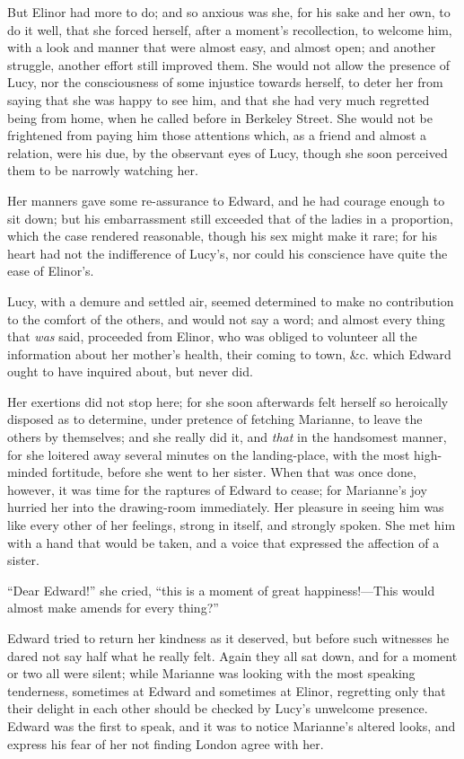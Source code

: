 \documentclass{article}
\begin{document}
But Elinor had more to do; and so anxious was she,
for his sake and her own, to do it well, that she
forced herself, after a moment's recollection,
to welcome him, with a look and manner that were almost easy,
and almost open; and another struggle, another effort still
improved them.  She would not allow the presence of Lucy,
nor the consciousness of some injustice towards herself,
to deter her from saying that she was happy to see him,
and that she had very much regretted being from home,
when he called before in Berkeley Street.  She would
not be frightened from paying him those attentions which,
as a friend and almost a relation, were his due, by the
observant eyes of Lucy, though she soon perceived them
to be narrowly watching her.

Her manners gave some re-assurance to Edward, and he
had courage enough to sit down; but his embarrassment still
exceeded that of the ladies in a proportion, which the case
rendered reasonable, though his sex might make it rare;
for his heart had not the indifference of Lucy's, nor
could his conscience have quite the ease of Elinor's.

Lucy, with a demure and settled air, seemed determined
to make no contribution to the comfort of the others,
and would not say a word; and almost every thing that \emph{was}
said, proceeded from Elinor, who was obliged to volunteer
all the information about her mother's health, their coming
to town, \&c. which Edward ought to have inquired about,
but never did.

Her exertions did not stop here; for she soon
afterwards felt herself so heroically disposed as
to determine, under pretence of fetching Marianne,
to leave the others by themselves; and she really did it,
and \emph{that} in the handsomest manner, for she loitered away
several minutes on the landing-place, with the most
high-minded fortitude, before she went to her sister.
When that was once done, however, it was time for the raptures
of Edward to cease; for Marianne's joy hurried her into
the drawing-room immediately.  Her pleasure in seeing him
was like every other of her feelings, strong in itself,
and strongly spoken.  She met him with a hand that would
be taken, and a voice that expressed the affection of a sister.

``Dear Edward!'' she cried, ``this is a moment of great
happiness!---This would almost make amends for every thing?''

Edward tried to return her kindness as it deserved,
but before such witnesses he dared not say half what he
really felt.  Again they all sat down, and for a moment
or two all were silent; while Marianne was looking with the
most speaking tenderness, sometimes at Edward and sometimes
at Elinor, regretting only that their delight in each
other should be checked by Lucy's unwelcome presence.
Edward was the first to speak, and it was to notice
Marianne's altered looks, and express his fear of her
not finding London agree with her.
\end{document}
